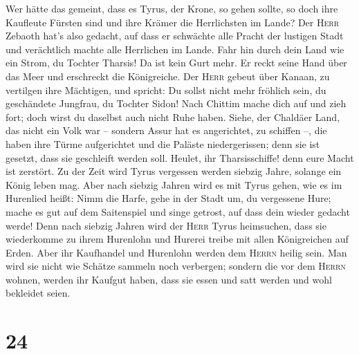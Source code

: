  Wer hätte das gemeint, dass es Tyrus, der Krone, so gehen
sollte, so doch ihre Kaufleute Fürsten sind und ihre Krämer die
Herrlichsten im Lande?  Der \textsc{Herr} Zebaoth hat's
also gedacht, auf dass er schwächte alle Pracht der lustigen Stadt und
verächtlich machte alle Herrlichen im Lande.  Fahr hin
durch dein Land wie ein Strom, du Tochter Tharsis! Da ist kein Gurt
mehr.  Er reckt seine Hand über das Meer und erschreckt
die Königreiche. Der \textsc{Herr} gebeut über Kanaan, zu vertilgen ihre
Mächtigen,  und spricht: Du sollst nicht mehr fröhlich
sein, du geschändete Jungfrau, du Tochter Sidon! Nach Chittim mache dich
auf und zieh fort; doch wirst du daselbst auch nicht Ruhe haben.
 Siehe, der Chaldäer Land, das nicht ein Volk war --
sondern Assur hat es angerichtet, zu schiffen --, die haben ihre Türme
aufgerichtet und die Paläste niedergerissen; denn sie ist gesetzt, dass
sie geschleift werden soll.  Heulet, ihr Tharsisschiffe!
denn eure Macht ist zerstört.  Zu der Zeit wird Tyrus
vergessen werden siebzig Jahre, solange ein König leben mag. Aber nach
siebzig Jahren wird es mit Tyrus gehen, wie es im Hurenlied heißt:
 Nimm die Harfe, gehe in der Stadt um, du vergessene
Hure; mache es gut auf dem Saitenspiel und singe getrost, auf dass dein
wieder gedacht werde!  Denn nach siebzig Jahren wird der
\textsc{Herr} Tyrus heimsuchen, dass sie wiederkomme zu ihrem Hurenlohn
und Hurerei treibe mit allen Königreichen auf Erden. 
Aber ihr Kaufhandel und Hurenlohn werden dem \textsc{Herrn} heilig sein.
Man wird sie nicht wie Schätze sammeln noch verbergen; sondern die vor
dem \textsc{Herrn} wohnen, werden ihr Kaufgut haben, dass sie essen und
satt werden und wohl bekleidet seien.

\hypertarget{section-23}{%
\section{24}\label{section-23}}

